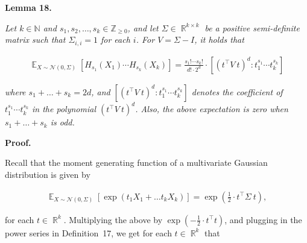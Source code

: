 



\par\medskip\noindent\textbf{
\textbf{Lemma 18}\textbf{.}
}\par



\emph{Let $k\in\mathbb{N}$ and $s_{1},s_{2},\dots,s_{k}\in\mathbb{Z}_{\geqslant 0}$, and let $\Sigma\in\mathop{\mathbb{R}}^{k\times k}$ be a positive semi-definite matrix such that $\Sigma_{i,i}=1$ for each $i$. For $V=\Sigma-I$, it holds that}\par


\[\begin{gathered}
\mathop{\mathbb{E}}_{X\sim\mathcal{N}(0,\Sigma)}\left[H_{s_{1}}(X_{1})\cdots H_{s_{k}}(X_{k})\right]=\frac{s_{1}!\cdots s_{k}!}{d!\cdot 2^{d}}\cdot\left[\left(t^{\top}V\ t\right)^{d}:t_{1}^{s_{1}}\cdots t_{k}^{s_{k}}\right]
\end{gathered}\]


\emph{where $s_{1}+\dots+s_{k}=2d$, and $\left[\left(t^{\top}V\ t\right)^{d}:t_{1}^{s_{1}}\cdots t_{k}^{s_{k}}\right]$ denotes the coefficient of $t_{1}^{s_{1}}\cdots t_{k}^{s_{k}}$ in the polynomial $\left(t^{\top}V\ t\right)^{d}$.
Also, the above expectation is zero when $s_{1}+\dots+s_{k}$ is odd.}\par







\par\medskip\noindent\textbf{Proof.}\par




Recall that the moment generating function of a multivariate Gaussian distribution is given by\par


\[\begin{gathered}
\mathop{\mathbb{E}}_{X\sim\mathcal{N}(0,\Sigma)}\left[\exp\left(t_{1}X_{1}+\dots t_{k}X_{k}\right)\right]=\exp\left(\frac{1}{2}\cdot t^{\top}\Sigma\ t\right),
\end{gathered}\]


for each $t\in\mathop{\mathbb{R}}^{k}$.
Multiplying the above by $\exp(-\frac{1}{2}\cdot t^{\top}t)$, and plugging in the power series in Definition 17, we get for each $t\in\mathop{\mathbb{R}}^{k}$ that\par




